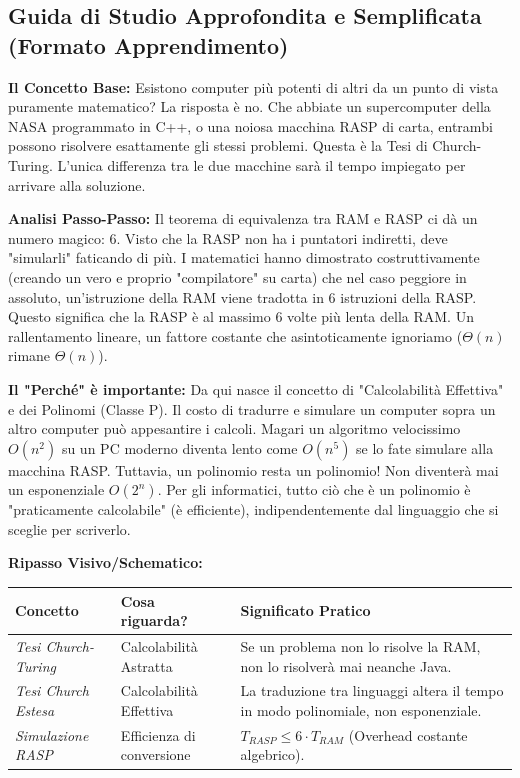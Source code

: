 \documentclass[a4paper, 11pt]{report}
\begin{document}
\vspace{0.5cm}
\subsection*{Guida di Studio Approfondita e Semplificata (Formato Apprendimento)}
\textbf{Il Concetto Base:}
Esistono computer più potenti di altri da un punto di vista puramente matematico? La risposta è no. Che abbiate un supercomputer della NASA programmato in C++, o una noiosa macchina RASP di carta, entrambi possono risolvere esattamente gli stessi problemi. Questa è la Tesi di Church-Turing. L'unica differenza tra le due macchine sarà il tempo impiegato per arrivare alla soluzione.

\textbf{Analisi Passo-Passo:}
Il teorema di equivalenza tra RAM e RASP ci dà un numero magico: 6.
Visto che la RASP non ha i puntatori indiretti, deve "simularli" faticando di più. I matematici hanno dimostrato costruttivamente (creando un vero e proprio "compilatore" su carta) che nel caso peggiore in assoluto, un'istruzione della RAM viene tradotta in 6 istruzioni della RASP. Questo significa che la RASP è al massimo 6 volte più lenta della RAM. Un rallentamento lineare, un fattore costante che asintoticamente ignoriamo ($\Theta(n)$ rimane $\Theta(n)$).

\textbf{Il "Perché" è importante:}
Da qui nasce il concetto di "Calcolabilità Effettiva" e dei Polinomi (Classe P). Il costo di tradurre e simulare un computer sopra un altro computer può appesantire i calcoli. Magari un algoritmo velocissimo $O(n^2)$ su un PC moderno diventa lento come $O(n^5)$ se lo fate simulare alla macchina RASP. Tuttavia, un polinomio resta un polinomio! Non diventerà mai un esponenziale $O(2^n)$. Per gli informatici, tutto ciò che è un polinomio è "praticamente calcolabile" (è efficiente), indipendentemente dal linguaggio che si sceglie per scriverlo.

\textbf{Ripasso Visivo/Schematico:}
\begin{center}
\begin{tabular}{|l|l|p{7cm}|}
\hline
\textbf{Concetto} & \textbf{Cosa riguarda?} & \textbf{Significato Pratico} \\
\hline
\textit{Tesi Church-Turing} & Calcolabilità Astratta & Se un problema non lo risolve la RAM, non lo risolverà mai neanche Java. \\
\hline
\textit{Tesi Church Estesa} & Calcolabilità Effettiva & La traduzione tra linguaggi altera il tempo in modo polinomiale, non esponenziale. \\
\hline
\textit{Simulazione RASP} & Efficienza di conversione & $T_{RASP} \le 6 \cdot T_{RAM}$ (Overhead costante algebrico). \\
\hline
\end{tabular}
\end{center}
\end{document}

